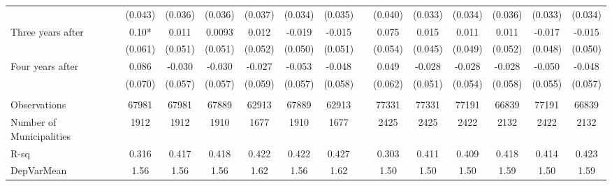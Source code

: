 \begin{tabular}{lccccccccccccc}
      & (0.043) & (0.036) & (0.036) & (0.037) & (0.034) & (0.035) &       & (0.040) & (0.033) & (0.034) & (0.036) & (0.033) & (0.034) \\
Three years after & 0.10* & 0.011 & 0.0093 & 0.012 & -0.019 & -0.015 &       & 0.075 & 0.015 & 0.011 & 0.011 & -0.017 & -0.015 \\
      & (0.061) & (0.051) & (0.051) & (0.052) & (0.050) & (0.051) &       & (0.054) & (0.045) & (0.049) & (0.052) & (0.048) & (0.050) \\
Four years after & 0.086 & -0.030 & -0.030 & -0.027 & -0.053 & -0.048 &       & 0.049 & -0.028 & -0.028 & -0.028 & -0.050 & -0.048 \\
      & (0.070) & (0.057) & (0.057) & (0.059) & (0.057) & (0.058) &       & (0.062) & (0.051) & (0.054) & (0.058) & (0.055) & (0.057) \\
      &       &       &       &       &       &       &       &       &       &       &       &       &  \\
\midrule
Observations & 67981 & 67981 & 67889 & 62913 & 67889 & 62913 &       & 77331 & 77331 & 77191 & 66839 & 77191 & 66839 \\
Number of Municipalities & 1912  & 1912  & 1910  & 1677  & 1910  & 1677  &       & 2425  & 2425  & 2422  & 2132  & 2422  & 2132 \\
R-sq  & 0.316 & 0.417 & 0.418 & 0.422 & 0.422 & 0.427 &       & 0.303 & 0.411 & 0.409 & 0.418 & 0.414 & 0.423 \\
DepVarMean & 1.56  & 1.56  & 1.56  & 1.62  & 1.56  & 1.62  &       & 1.50  & 1.50  & 1.50  & 1.59  & 1.50  & 1.59 \\
\bottomrule
\bottomrule
\end{tabular}%

